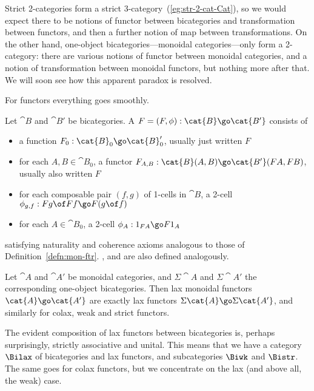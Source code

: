 Strict 2-categories form a strict 3-category~(\ref{eg:str-2-cat-Cat}),%
%
%
so
we would expect there to be notions of functor between bicategories and
transformation between functors, and then a further notion of map between
transformations.  On the other hand, one-object%
%
%
bicategories---monoidal
categories---only form a 2-category: there are various notions of functor
between monoidal categories, and a notion of transformation between
monoidal functors, but nothing more after that.  We will soon see how this
apparent paradox is resolved.

For functors everything goes smoothly. 
% 
\begin{defn}
Let $\cat{B}$ and $\cat{B'}$ be bicategories.  A %
%
%
%
% 
$F = (F, \phi): \cat{B} \go \cat{B'}$ consists of
%
\begin{itemize}
  \item a function $F_0: \cat{B}_0 \go \cat{B}'_0$, usually just written
  $F$
  \item for each $A, B \in \cat{B}_0$, a functor $F_{A, B}: \cat{B}(A, B)
  \go \cat{B'}(FA, FB)$, usually also written $F$
  \item for each composable pair $(f, g)$ of 1-cells in $\cat{B}$, a 2-cell
  $\phi_{g, f}: Fg \of Ff \go F(g\of f)$ 
  \item for each $A \in \cat{B}_0$, a 2-cell $\phi_A: 1_{FA} \go
  F1_A$ 
\end{itemize}
%
satisfying naturality and coherence axioms analogous to those of
Definition~\ref{defn:mon-ftr}.  ,  and
 are also defined analogously. 
\end{defn}

\begin{example}	
Let $\cat{A}$ and $\cat{A'}$ be monoidal categories, and $\Sigma\cat{A}$%
% 
%
% 
and $\Sigma\cat{A'}$ the corresponding one-object bicategories.  Then lax
monoidal functors $\cat{A} \go \cat{A'}$ are exactly%
%
%
lax functors
$\Sigma\cat{A} \go \Sigma\cat{A'}$, and similarly for colax, weak and
strict functors. 
\end{example}

The evident composition of lax functors between bicategories is, perhaps
surprisingly, strictly associative and unital.  This means that we have a
category $\Bilax$%
% 
% 
of bicategories and lax functors, and subcategories $\Biwk$ and $\Bistr$.
The same goes for colax functors, but we concentrate on the lax (and above
all, the weak) case.

